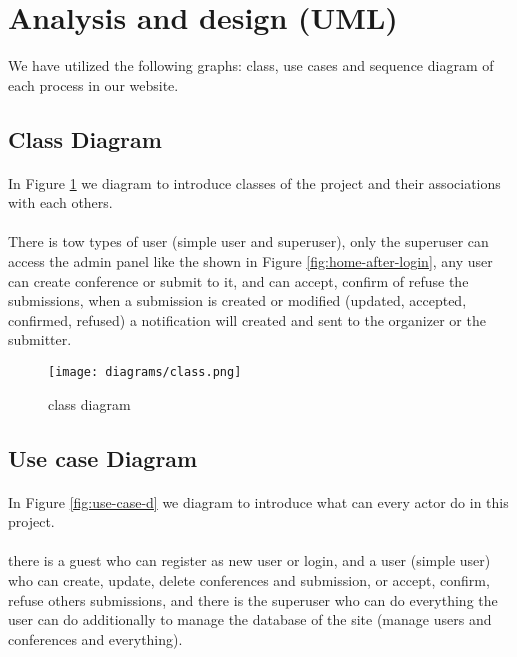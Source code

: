 \section{Analysis and design (UML)}
We have utilized the following graphs: class, use cases and sequence diagram of each process in our website.

	\subsection{Class Diagram}
	\paragraph{}
	In Figure \ref{fig:class-d} we diagram to introduce classes of the project and their associations with each others.
	\paragraph{}
	There is tow types of user (simple user and superuser), only the superuser can access the admin panel like the shown in Figure \ref{fig:home-after-login}, any user can create conference or submit to it, and can accept, confirm of refuse the submissions, when a submission is created or modified (updated, accepted, confirmed, refused) a notification will created and sent to the organizer or the submitter.
	
		\begin{figure}[!ht]
			\centering
			\texttt{[image: diagrams/class.png]}
			\caption{class diagram}
			\label{fig:class-d}
		\end{figure}
	
	\subsection{Use case Diagram}
	\paragraph{}
	In Figure \ref{fig:use-case-d} we diagram to introduce what can every actor do in this project.
	\paragraph{}
	there is a guest who can register as new user or login, and a user (simple user) who can create, update, delete conferences and submission, or accept, confirm, refuse others submissions, and there is the superuser who can do everything the user can do additionally to manage the database of the site (manage users and conferences and everything).
	
